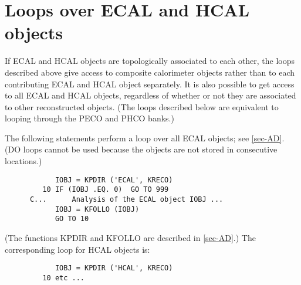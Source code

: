 \section{\label{sec-ALC}Loops over ECAL and HCAL objects}
\par
If ECAL and HCAL objects are topologically associated to each other,
the loops described above give access to composite calorimeter objects
rather than to each contributing ECAL and HCAL object separately.
It is also possible to get access to all ECAL and HCAL objects, regardless
of
whether or not they are associated to other reconstructed objects.
(The
loops described below are equivalent to looping through the PECO and
PHCO
banks.)
 
The following statements perform a loop over all ECAL objects;
see \ref{sec-AD}.
(DO loops cannot be used because the objects are
not stored in consecutive locations.)
\begin{verbatim}
            IOBJ = KPDIR ('ECAL', KRECO)
         10 IF (IOBJ .EQ. 0)  GO TO 999
      C...      Analysis of the ECAL object IOBJ ...
            IOBJ = KFOLLO (IOBJ)
            GO TO 10
\end{verbatim}
(The functions KPDIR and KFOLLO are described in
\ref{sec-AD}.)
The corresponding loop for HCAL objects is:
\begin{verbatim}
            IOBJ = KPDIR ('HCAL', KRECO)
         10 etc ...
\end{verbatim}
